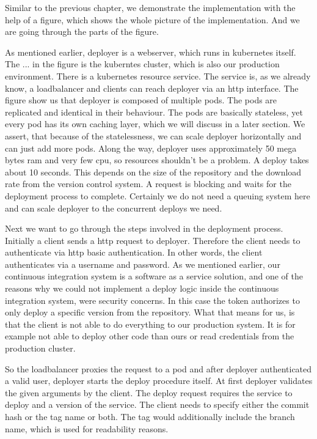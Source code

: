 Similar to the previous chapter, we demonstrate the implementation with the help of
a figure, which shows the whole picture of the implementation. And we are going through
the parts of the figure.

As mentioned earlier, deployer is a webserver, which runs in kubernetes itself. The ... in
the figure is the kuberntes cluster, which is also our production environment. There is a
kubernetes resource service. The service is, as we already know, a loadbalancer and
clients can reach deployer via an http interface. The figure show us that deployer is
composed of multiple pods. The pods are replicated and identical in their behaviour. The
pods are basically stateless, yet every pod has its own caching layer, which we will
discuss in a later section. We assert, that because of the statelessness, we can scale
deployer horizontally and can just add more pods. Along the way, deployer uses
approximately 50 mega bytes ram and very few cpu, so resources shouldn't be a problem. A
deploy takes about 10 seconds. This depends on the size of the repository and the download
rate from the version control system. A request is blocking and waits for the deployment
process to complete. Certainly we do not need a queuing system here and can scale deployer
to the concurrent deploys we need.

Next we want to go through the steps involved in the deployment process. Initially a
client sends a http request to deployer. Therefore the client needs to authenticate via
http basic authentication. In other words, the client authenticates via a username and
password. As we mentioned earlier, our continuous integration system is a software as a
service solution, and one of the reasons why we could not implement a deploy logic inside
the continuous integration system, were security concerns. In this case the token
authorizes to only deploy a specific version from the repository. What that means for us,
is that the client is not able to do everything to our production system. It is for
example not able to deploy other code than ours or read credentials from the production
cluster.

So the loadbalancer proxies the request to a pod and after deployer authenticated a valid
user, deployer starts the deploy procedure itself. At first deployer validates the given
arguments by the client. The deploy request requires the service to deploy and a version
of the service. The client needs to specify either the commit hash or the tag name or
both. The tag would additionally include the branch name, which is used for readability
reasons.

